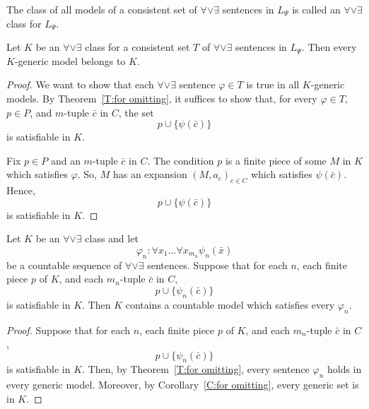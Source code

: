 \documentclass{scrartcl}
\renewcommand{\phi}{\varphi}
\newcommand{\aore}{\forall \vee \exists}
\begin{document}
\begin{definition}
The class of all models of a consistent set of $\aore$ sentences in $L_\Psi$ is called an $\aore$ class for $L_\Psi$.
\end{definition}


\begin{corollary}
\label{C:for omitting}
Let $K$ be an $\aore$ class for a consistent set $T$ of $\aore$ sentences in $L_\Psi$. Then every $K$-generic model belongs to $K$.
\end{corollary}

\begin{proof}
We want to show that each $\aore$ sentence $\phi \in T$ is true in all $K$-generic models. By Theorem~\ref{T:for omitting}, it suffices to show that, for every $\phi \in T$, $p\in P$, and $m$-tuple $\bar{c}$ in $C$, the set
\[
p\cup \{ \psi(\bar{c}) \}
\]
is satisfiable in $K$.

Fix $p\in P$ and an $m$-tuple $\bar{c}$ in $C$. The condition $p$ is a finite piece of some $M$ in $K$ which satisfies $\phi$. So, $M$ has an expansion $(M, a_c)_{c\in C}$ which satisfies $\psi(\bar{c})$. Hence,
\[
p\cup \{ \psi(\bar{c}) \}
\]
is satisfiable in $K$.
\end{proof}



\begin{theorem}
Let $K$ be an $\aore$ class and let
\[
\phi_n \colon \forall x_1 \dots \forall x_{m_n} \psi_n(\bar{x})
\]
be a countable sequence of $\aore$ sentences. Suppose that for each $n$, each finite piece $p$ of $K$, and each $m_n$-tuple $\bar{c}$ in $C$,
\[
p\cup \{ \psi_n(\bar{c}) \}
\]
is satisfiable in $K$. Then $K$ contains a countable model which satisfies every $\phi_n$.
\end{theorem}

\begin{proof}
Suppose that for each $n$, each finite piece $p$ of $K$, and each $m_n$-tuple $\bar{c}$ in $C$,
\[
p\cup \{ \psi_n(\bar{c}) \}
\]
is satisfiable in $K$. Then, by Theorem~\ref{T:for omitting}, every sentence $\phi_n$ holds in every generic model. Moreover, by Corollary~\ref{C:for omitting}, every generic set is in $K$.
\end{proof}
\end{document}
